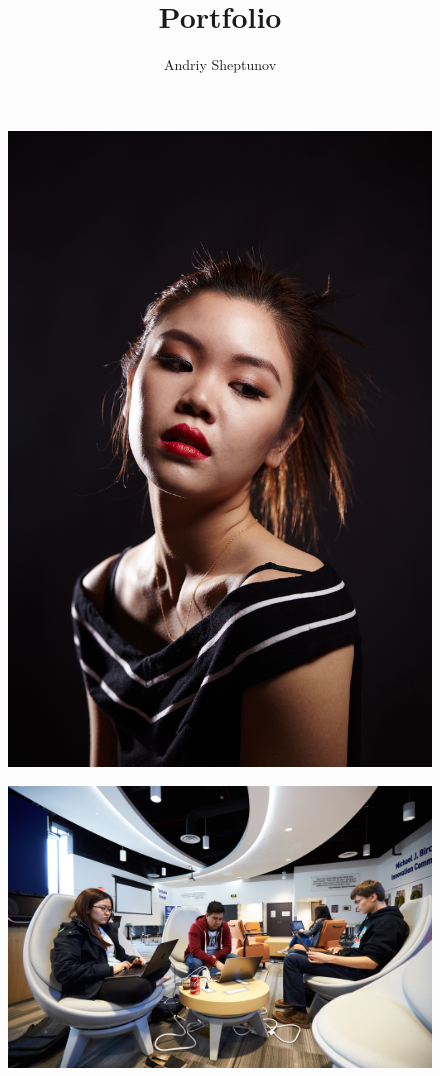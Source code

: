 \documentclass{report}
\title{Portfolio}
\author{Andriy Sheptunov}
\date{}
\begin{document}
\maketitle

\begin{figure}
  \centering
  \includegraphics[width=\textwidth]{res/port_allison.jpg}
\end{figure}

\begin{landscape}
  \begin{figure}
    \centering
    \includegraphics[height=\textheight]{res/promo_in2.jpg}
  \end{figure}
\end{landscape}
\end{document}
